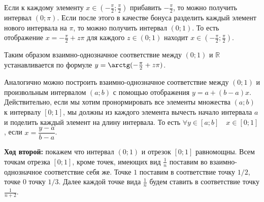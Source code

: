 \documentclass[pdftex, 12pt, a4paper]{article}
\def \mbb{\mathbb}
\def \RR{\mbb R}
\theoremstyle{definition} %
\numberwithin{problem}{section}
\numberwithin{blits}{section}
\begin{document}
\begin{itemize}
\begin{itemize}
\begin{center}
\end{center}


Если к каждому элементу $x \in (-\frac{\pi}{2};\frac{\pi}{2})$  прибавить $-\frac{\pi}{2}$, то можно получить интервал $(0;\pi)$. Если после этого в качестве бонуса разделить каждый элемент нового интервала на $\pi$, то можно получить интервал $(0;1)$. То есть отображение $x = - \frac{\pi}{2} + z \pi$ для каждого $z \in (0;1)$ находит $x \in (-\frac{\pi}{2};\frac{\pi}{2})$.

Таким образом взаимно-однозначное соответствие между $(0;1)$ и $\RR$ устанавливается по формуле $y = \arctg(- \frac{\pi}{2} + z \pi)$.

Аналогично можно построить взаимно-однозначное соответствие между $(0;1)$ и  произвольным интервалом $(a;b)$ с помощью отображения $y = a+(b-a)x$. Действительно, если мы хотим пронормировать все элементы множества $(a;b)$ к интервалу $[0;1]$, мы должны из каждого элемента вычесть начало интервала $a$ и поделить каждый элемент на длину интервала. То есть $\forall y \in [a;b] \quad x \in [0;1]$, если $x = \dfrac{y-a}{b-a}$.

\textbf{Ход второй:} покажем что интервал $(0;1)$ и отрезок $[0;1]$ равномощны. Всем точкам отрезка $[0;1]$, кроме точек, имеющих вид $\frac{1}{n}$ поставим во взаимно-однозначное соответствие себя же. Точке $1$ поставим в соответствие точку $1/2$, точке $0$ точку $1/3$. Далее каждой точке вида $\frac{1}{n}$  будем ставить в соответствие точку $\frac{1}{n+2}$.


\end{itemize}
\end{itemize}
\end{document}
